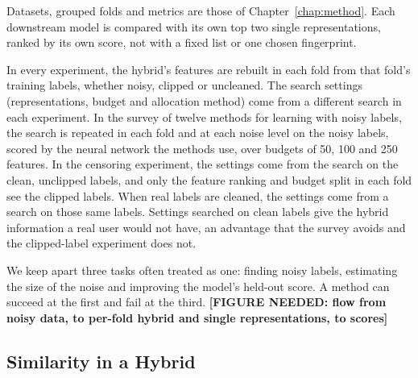 
Datasets, grouped folds and metrics are those of Chapter~\ref{chap:method}. Each downstream model is compared with its own top two single representations, ranked by its own score, not with a fixed list or one chosen fingerprint.

In every experiment, the hybrid's features are rebuilt in each fold from that fold's training labels, whether noisy, clipped or uncleaned. The search settings (representations, budget and allocation method) come from a different search in each experiment. In the survey of twelve methods for learning with noisy labels, the search is repeated in each fold and at each noise level on the noisy labels, scored by the neural network the methods use, over budgets of 50, 100 and 250 features. In the censoring experiment, the settings come from the search on the clean, unclipped labels, and only the feature ranking and budget split in each fold see the clipped labels. When real labels are cleaned, the settings come from a search on those same labels. Settings searched on clean labels give the hybrid information a real user would not have, an advantage that the survey avoids and the clipped-label experiment does not.

We keep apart three tasks often treated as one: finding noisy labels, estimating the size of the noise and improving the model's held-out score. A method can succeed at the first and fail at the third. \textbf{[FIGURE NEEDED: flow from noisy data, to per-fold hybrid and single representations, to scores]}



\subsection{Similarity in a Hybrid}

